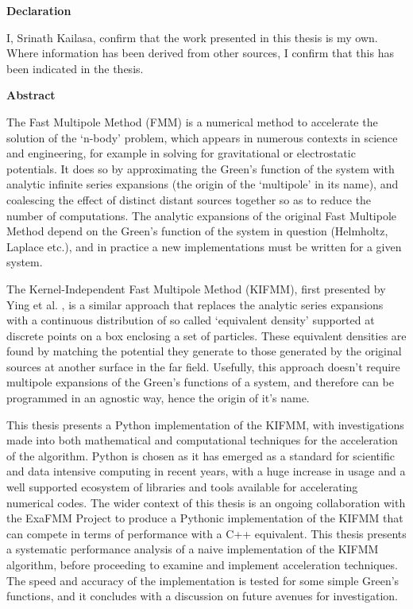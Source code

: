 \thispagestyle{plain}

\begin{center}
    \textbf{Declaration}
\end{center}
I, Srinath Kailasa, confirm that the work presented in this thesis is my own. Where information has been derived from other
sources, I confirm that this has been indicated in the thesis.

\begin{center}
    \textbf{Abstract}
\end{center}

The Fast Multipole Method (FMM) is a numerical method to accelerate the solution
of the `n-body' problem, which appears in numerous contexts in science and engineering,
for example in solving for gravitational or electrostatic potentials. It does so by approximating
the Green's function of the
system with analytic infinite series expansions (the origin of the `multipole' in its name),
 and coalescing the effect of distinct distant sources together so as to
reduce the number of computations. The analytic expansions of the
original Fast Multipole Method depend on the Green's function of the system in
question (Helmholtz, Laplace etc.), and in practice a new implementations
must be written for a given system.

The Kernel-Independent Fast Multipole Method (KIFMM),
first presented by Ying et al. \cite{Ying:2004:JCP}, is a similar approach that replaces
the analytic series expansions with a continuous distribution of so called
`equivalent density' supported at discrete points on a box enclosing a set of
particles. These equivalent densities are found by matching the potential they
generate to those generated by the original sources at another surface in the
far field. Usefully, this approach doesn't require multipole expansions of the
Green's functions of a system, and therefore can be programmed in an agnostic way,
hence the origin of it's name.

This thesis presents a Python implementation of
the KIFMM, with investigations made into both mathematical and computational
techniques for the acceleration of the algorithm. Python is chosen as it has emerged as a standard
for scientific and data intensive computing in recent years, with a huge increase
in usage and a well supported ecosystem of libraries and tools available for
accelerating numerical codes. The wider context of this thesis
is an ongoing collaboration with the ExaFMM Project \cite{exafmm} to produce a Pythonic
implementation of the KIFMM that can compete in terms of performance with
a C++ equivalent. This thesis presents a systematic performance analysis
of a naive implementation of the KIFMM algorithm, before proceeding to examine and implement
acceleration techniques. The speed and accuracy of the implementation is tested
for some simple Green's functions, and it concludes with a discussion on future avenues
for investigation.